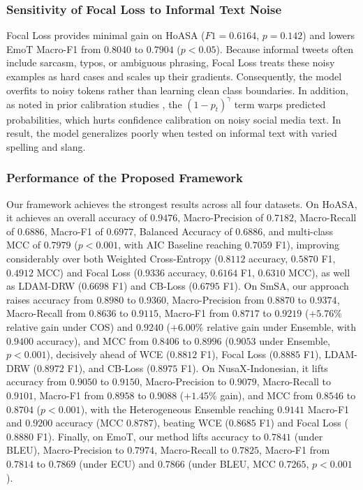 \documentclass[10pt,journal,compsoc]{IEEEtran}
\begin{document}
\subsubsection{Sensitivity of Focal Loss to Informal Text Noise}
\label{subsubsec:focal_noise}
Focal Loss provides minimal gain on HoASA ($F1 = 0.6164$, $p = 0.142$) and lowers EmoT Macro-F1 from $0.8040$ to $0.7904$ ($p < 0.05$). Because informal tweets often include sarcasm, typos, or ambiguous phrasing, Focal Loss treats these noisy examples as hard cases and scales up their gradients. Consequently, the model overfits to noisy tokens rather than learning clean class boundaries. In addition, as noted in prior calibration studies \cite{minderer2021revisiting, zhong2021improving, wang2023margin}, the $(1-p_t)^\gamma$ term warps predicted probabilities, which hurts confidence calibration on noisy social media text. In result, the model generalizes poorly when tested on informal text with varied spelling and slang.

\subsubsection{Performance of the Proposed Framework}
\label{subsubsec:proposed_perf}
Our framework achieves the strongest results across all four datasets. On HoASA, it achieves an overall accuracy of \textbf{$0.9476$}, Macro-Precision of \textbf{$0.7182$}, Macro-Recall of \textbf{$0.6886$}, Macro-F1 of \textbf{$0.6977$}, Balanced Accuracy of \textbf{$0.6886$}, and multi-class MCC of \textbf{$0.7979$} ($p < 0.001$, with AIC Baseline reaching $0.7059$ F1), improving considerably over both Weighted Cross-Entropy ($0.8112$ accuracy, $0.5870$ F1, $0.4912$ MCC) and Focal Loss ($0.9336$ accuracy, $0.6164$ F1, $0.6310$ MCC), as well as LDAM-DRW ($0.6698$ F1) and CB-Loss ($0.6795$ F1). On SmSA, our approach raises accuracy from $0.8980$ to \textbf{$0.9360$}, Macro-Precision from $0.8870$ to \textbf{$0.9374$}, Macro-Recall from $0.8636$ to \textbf{$0.9115$}, Macro-F1 from $0.8717$ to \textbf{$0.9219$} ($+5.76\%$ relative gain under COS) and \textbf{$0.9240$} ($+6.00\%$ relative gain under Ensemble, with \textbf{$0.9400$} accuracy), and MCC from $0.8406$ to \textbf{$0.8996$} ($0.9053$ under Ensemble, $p < 0.001$), decisively ahead of WCE ($0.8812$ F1), Focal Loss ($0.8885$ F1), LDAM-DRW ($0.8972$ F1), and CB-Loss ($0.8975$ F1). On NusaX-Indonesian, it lifts accuracy from $0.9050$ to \textbf{$0.9150$}, Macro-Precision to \textbf{$0.9079$}, Macro-Recall to \textbf{$0.9101$}, Macro-F1 from $0.8958$ to \textbf{$0.9088$} ($+1.45\%$ gain), and MCC from $0.8546$ to \textbf{$0.8704$} ($p < 0.001$), with the Heterogeneous Ensemble reaching \textbf{$0.9141$} Macro-F1 and \textbf{$0.9200$} accuracy (MCC \textbf{$0.8787$}), beating WCE ($0.8685$ F1) and Focal Loss ($0.8880$ F1). Finally, on EmoT, our method lifts accuracy to \textbf{$0.7841$} (under BLEU), Macro-Precision to \textbf{$0.7974$}, Macro-Recall to \textbf{$0.7825$}, Macro-F1 from $0.7814$ to \textbf{$0.7869$} (under ECU) and \textbf{$0.7866$} (under BLEU, MCC \textbf{$0.7265$}, $p < 0.001$).
\end{document}
